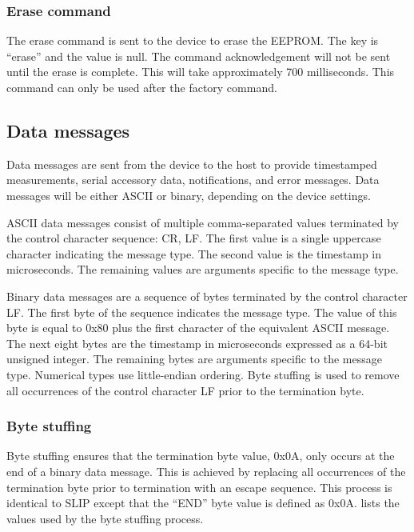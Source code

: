 \warning

\subsubsection{Erase command}

The erase command is sent to the device to erase the \ac{EEPROM}.  The key is \enquote{erase} and the value is null.  The command acknowledgement will not be sent until the erase is complete.  This will take approximately 700 milliseconds.  This command can only be used after the factory command.


\warning

\subsection{Data messages}
\label{sec:dataMessages}

Data messages are sent from the device to the host to provide timestamped measurements, serial accessory data, notifications, and error messages.  Data messages will be either \ac{ASCII} or binary, depending on the device settings.

\ac{ASCII} data messages consist of multiple comma-separated values terminated by the control character sequence: \ac{CR}, \ac{LF}.  The first value is a single uppercase character indicating the message type.  The second value is the timestamp in microseconds.  The remaining values are arguments specific to the message type.

Binary data messages are a sequence of bytes terminated by the control character \ac{LF}.  The first byte of the sequence indicates the message type.  The value of this byte is equal to 0x80 plus the first character of the equivalent \ac{ASCII} message.  The next eight bytes are the timestamp in microseconds expressed as a 64-bit unsigned integer.  The remaining bytes are arguments specific to the message type.  Numerical types use little-endian ordering.  Byte stuffing is used to remove all occurrences of the control character \ac{LF} prior to the termination byte.

\subsubsection{Byte stuffing}
\label{sec:byteStuffing}

Byte stuffing ensures that the termination byte value, 0x0A, only occurs at the end of a binary data message.  This is achieved by replacing all occurrences of the termination byte prior to termination with an escape sequence.  This process is identical to \ac{SLIP} except that the \enquote{END} byte value is defined as 0x0A.   lists the values used by the byte stuffing process.


